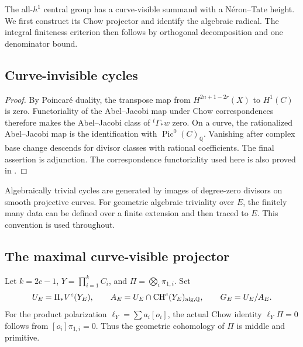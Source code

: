 \documentclass[11pt,a4paper]{article}
\newtheorem{lemma}[theorem]{Lemma}
\theoremstyle{definition}
\newcommand{\Q}{\mathbb Q}\newcommand{\R}{\mathbb R}\newcommand{\C}{\mathbb C}
\newcommand{\CH}{\operatorname{CH}}\newcommand{\Pic}{\operatorname{Pic}}
\numberwithin{equation}{section}
\begin{document}
The all-\(h^1\) central group has a curve-visible summand with a
Néron--Tate height. We first construct its Chow projector and identify
the algebraic radical. The integral finiteness criterion then follows
by orthogonal decomposition and one denominator bound.

\subsection{Curve-invisible cycles}\label{sec:invisible-cycles}


\begin{proof}
By Poincaré duality, the transpose map from
\(H^{2n+1-2r}(X)\) to \(H^1(C)\) is zero. Functoriality of the
Abel--Jacobi map under Chow correspondences therefore makes the
Abel--Jacobi class of \({}^t\Gamma_*w\) zero. On a curve, the
rationalized Abel--Jacobi map is the identification with
\(\Pic^0(C)_\Q\). Vanishing after complex base change descends for
divisor classes with rational coefficients. The final assertion is
adjunction. The correspondence functoriality used here is also
proved in \cite[Lemma~4.11]{LagaShnidman}.
\end{proof}

Algebraically trivial cycles are generated by images of degree-zero
divisors on smooth projective curves. For geometric algebraic
triviality over \(E\), the finitely many data can be defined over a
finite extension and then traced to \(E\). This convention is used
throughout.

\subsection{The maximal curve-visible projector}
\label{sec:central-projector}

Let \(k=2c-1\), \(Y=\prod_{i=1}^kC_i\), and
\(\Pi=\bigotimes_i\pi_{1,i}\). Set
\[
 U_E=\Pi_*V^c(Y_E),\qquad
 A_E=U_E\cap\CH^c(Y_E)_{\alg,\Q},\qquad G_E=U_E/A_E.
\]
For the product polarization \(\ell_Y=\sum a_i[o_i]\), the actual
Chow identity \(\ell_Y\Pi=0\) follows from
\([o_i]\pi_{1,i}=0\). Thus the geometric cohomology of \(\Pi\)
is middle and primitive.
\end{document}
